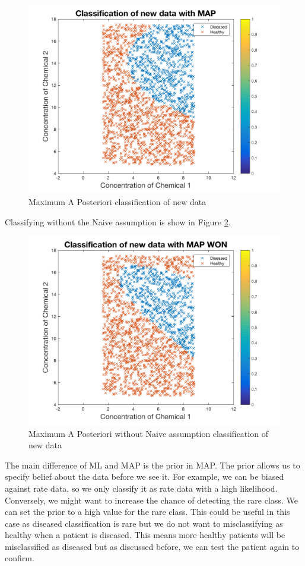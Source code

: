 {{\begin{figure}[h]
	\centering
	\includegraphics[width=0.8\linewidth]{images/MAPnewData}
	\caption{Maximum A Posteriori classification of new data}
	\label{fig:MAP}
\end{figure}

Classifying without the Naive assumption is show in Figure \ref{fig:MAPWON}.

\begin{figure}[h]
	\centering
	\includegraphics[width=0.8\linewidth]{images/MAPWONnewData}
	\caption{Maximum A Posteriori without Naive assumption classification of new data}
	\label{fig:MAPWON}
\end{figure}
	
The main difference of ML and MAP is the prior in MAP. The prior allows us to specify belief about the data before we see it. For example, we can be biased against rate data, so we only classify it as rate data with a high likelihood. Conversely, we might want to increase the chance of detecting the rare class. We can set the prior to a high value for the rare class. This could be useful in this case as diseased classification is rare but we do not want to misclassifying as healthy when a patient is diseased. This means more healthy patients will be misclassified as diseased but as discussed before, we can test the patient again to confirm.

}}
